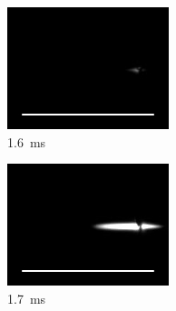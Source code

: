 \begin{figure}[h]
    \centering
    \begin{subfigure}[t]{0.3\textwidth}
        \centering
        \includegraphics[width=\textwidth]{assets/5 results/ignitionFrames/16.jpg}
        \caption{\qty{1.6}{ms}}
        \label{fig:ignition_frames_16}
    \end{subfigure}
    \hfill
    \begin{subfigure}[t]{0.3\textwidth}
        \centering
        \includegraphics[width=\textwidth]{assets/5 results/ignitionFrames/17.jpg}
        \caption{\qty{1.7}{ms}}
        \label{fig:ignition_frames_17}
    \end{subfigure}
    \hfill
    \begin{subfigure}[t]{0.3\textwidth}

\end{subfigure}
\end{figure}
